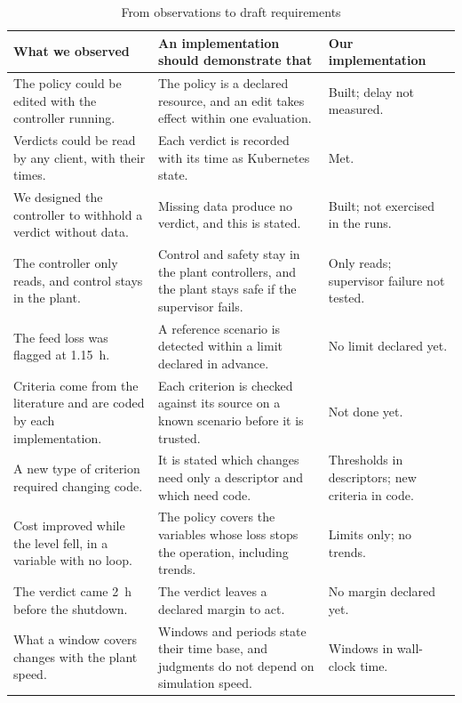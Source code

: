 \documentclass[conference]{IEEEtran}
\begin{document}
\begin{table}[t]
\caption{From observations to draft requirements}
\label{tab:draft}
\centering
\footnotesize
\begin{tabular}{@{}>{\raggedright\arraybackslash}p{}>{\raggedright\arraybackslash}p{}>{\raggedright\arraybackslash}p{}@{}}
\toprule
What we observed & An implementation should demonstrate that & Our implementation \\
\midrule
The policy could be edited with the controller running. & The policy is a declared resource, and an edit takes effect within one evaluation. & Built; delay not measured. \\
Verdicts could be read by any client, with their times. & Each verdict is recorded with its time as Kubernetes state. & Met. \\
We designed the controller to withhold a verdict without data. & Missing data produce no verdict, and this is stated. & Built; not exercised in the runs. \\
The controller only reads, and control stays in the plant. & Control and safety stay in the plant controllers, and the plant stays safe if the supervisor fails. & Only reads; supervisor failure not tested. \\
The feed loss was flagged at 1.15~h. & A reference scenario is detected within a limit declared in advance. & No limit declared yet. \\
Criteria come from the literature and are coded by each implementation. & Each criterion is checked against its source on a known scenario before it is trusted. & Not done yet. \\
A new type of criterion required changing code. & It is stated which changes need only a descriptor and which need code. & Thresholds in descriptors; new criteria in code. \\
Cost improved while the level fell, in a variable with no loop. & The policy covers the variables whose loss stops the operation, including trends. & Limits only; no trends. \\
The verdict came 2~h before the shutdown. & The verdict leaves a declared margin to act. & No margin declared yet. \\
What a window covers changes with the plant speed. & Windows and periods state their time base, and judgments do not depend on simulation speed. & Windows in wall-clock time. \\
\bottomrule
\end{tabular}
\end{table}
\end{document}
